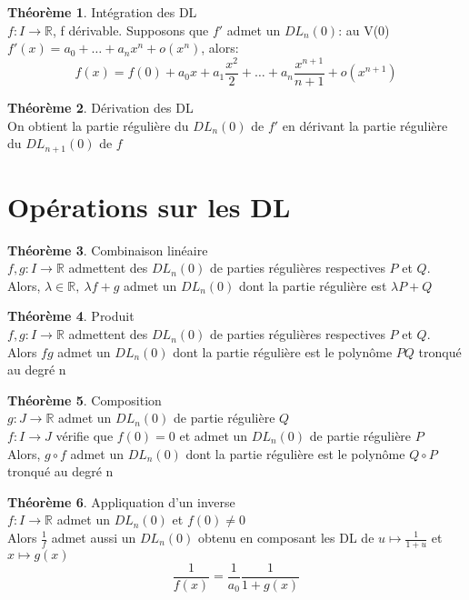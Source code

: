 \documentclass[fleqn]{article}
\theoremstyle{definition} \newtheorem*{defi}{D\'efinition}
\theoremstyle{definition} \newtheorem*{theo}{Th\'eor\`eme}
\theoremstyle{definition} \newtheorem*{prop}{Propri\'et\'e}
\theoremstyle{definition} \newtheorem*{coro}{Corollaire}
\theoremstyle{remark} \newtheorem*{rqs}{Remarques}
\begin{document}
\begin{theo} Int\'egration des DL \\
	$f: I \rightarrow \mathbb{R}$, f d\'erivable. Supposons que $f'$ admet un $DL_n(0)$: au V(0)\\
	$f'(x) = a_0 + \hdots + a_n x^{n} + o(x^n)$, alors:
	\[f(x) = f(0) + a_0 x + a_1 \frac{x^2}{2} + \hdots + a_n \frac{x^{n+1}}{n+1} + o(x^{n+1})\]
\end{theo}

\begin{theo} D\'erivation des DL \\
	On obtient la partie r\'eguli\`ere du $DL_n(0)$ de $f'$ en d\'erivant la partie r\'eguli\`ere du $DL_{n+1}(0)$ de $f$
\end{theo}

\section{Op\'erations sur les DL}
\begin{theo} Combinaison lin\'eaire\\
	$f,g: I \rightarrow \mathbb{R}$ admettent des $DL_n(0)$ de parties r\'eguli\`eres respectives $P$ et $Q$. \\
	Alors, $\lambda \in \mathbb{R},\ \lambda f + g$ admet un $DL_n(0)$ dont la partie r\'eguli\`ere est $\lambda P + Q$
\end{theo}

\begin{theo} Produit \\
	$f,g: I \rightarrow \mathbb{R}$ admettent des $DL_n(0)$ de parties r\'eguli\`eres respectives $P$ et $Q$. \\
	Alors $fg$ admet un $DL_n(0)$ dont la partie r\'eguli\`ere est le polyn\^ome $PQ$ tronqu\'e au degr\'e n
\end{theo}

\begin{theo} Composition \\
	$g: J \rightarrow \mathbb{R}$ admet un $DL_n(0)$ de partie r\'eguli\`ere $Q$ \\
	$f: I \rightarrow J$ v\'erifie que $f(0) = 0$ et admet un $DL_n(0)$ de partie r\'eguli\`ere $P$ \\
	Alors, $g \circ f$ admet un $DL_n(0)$ dont la partie r\'eguli\`ere est le polyn\^ome $Q \circ P$ tronqu\'e au degr\'e n
\end{theo}

\begin{theo} Appliquation d'un inverse \\
	$f: I \rightarrow \mathbb{R}$ admet un $DL_n(0)$ et $f(0) \neq 0$ \\
	Alors $\frac{1}{f}$ admet aussi un $DL_n(0)$ obtenu en composant les DL de $u \mapsto \frac{1}{1+u}$ et $x \mapsto g(x)$
	\[\frac{1}{f(x)} = \frac{1}{a_0} \frac{1}{1 + g(x)}\]
\end{theo}
\end{document}

